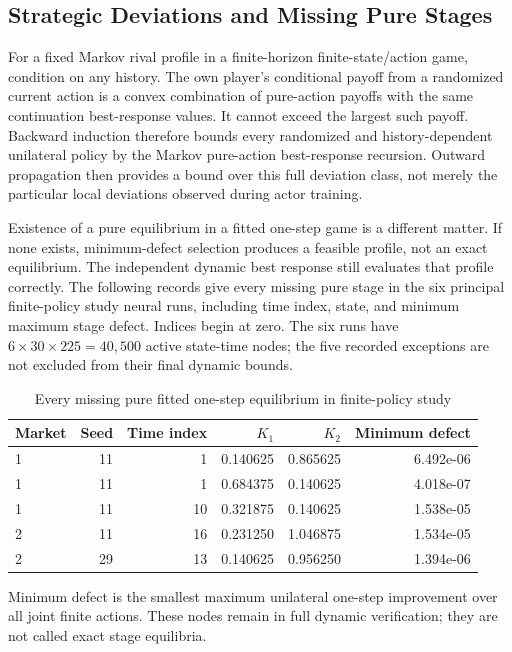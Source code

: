 \documentclass[ecta,nameyear,draft]{econsocart}
\theoremstyle{definition}
\theoremstyle{remark}
\begin{document}
\subsection{Strategic Deviations and Missing Pure Stages}\label{supp:r8-games}
For a fixed Markov rival profile in a finite-horizon finite-state/action game, condition on any history. The own player's conditional payoff from a randomized current action is a convex combination of pure-action payoffs with the same continuation best-response values. It cannot exceed the largest such payoff. Backward induction therefore bounds every randomized and history-dependent unilateral policy by the Markov pure-action best-response recursion. Outward propagation then provides a bound over this full deviation class, not merely the particular local deviations observed during actor training.

Existence of a pure equilibrium in a fitted one-step game is a different matter. If none exists, minimum-defect selection produces a feasible profile, not an exact equilibrium. The independent dynamic best response still evaluates that profile correctly. The following records give every missing pure stage in the six principal finite-policy study neural runs, including time index, state, and minimum maximum stage defect. Indices begin at zero. The six runs have $6\times30\times225=40{,}500$ active state-time nodes; the five recorded exceptions are not excluded from their final dynamic bounds.

\begin{table}[htbp]\centering
\caption{Every missing pure fitted one-step equilibrium in finite-policy study}
\begin{small}\begin{tabular}{lrrrrr}
\toprule
Market & Seed & Time index & $K_1$ & $K_2$ & Minimum defect \\
\midrule
1 & 11 & 1 & 0.140625 & 0.865625 & 6.492e-06 \\
1 & 11 & 1 & 0.684375 & 0.140625 & 4.018e-07 \\
1 & 11 & 10 & 0.321875 & 0.140625 & 1.538e-05 \\
2 & 11 & 16 & 0.231250 & 1.046875 & 1.534e-05 \\
2 & 29 & 13 & 0.140625 & 0.956250 & 1.394e-06 \\
\bottomrule\end{tabular}\end{small}
\par\smallskip\begin{minipage}{0.96\linewidth}\footnotesize Minimum defect is the smallest maximum unilateral one-step improvement over all joint finite actions. These nodes remain in full dynamic verification; they are not called exact stage equilibria.\end{minipage}
\end{table}
\end{document}
